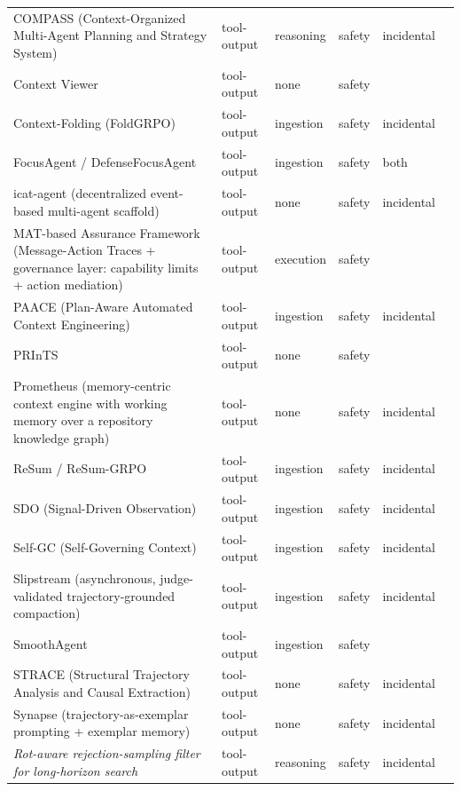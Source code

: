 \begin{longtable}{@{}p{}lllll@{}}
COMPASS (Context-Organized Multi-Agent Planning and Strategy System) & tool-output & reasoning & safety & incidental & \cite{wan-2025-compass} \\
Context Viewer & tool-output & none & safety &  & \cite{sriraman-2026-context} \\
Context-Folding (FoldGRPO) & tool-output & ingestion & safety & incidental & \cite{sun-2025-scaling} \\
FocusAgent / DefenseFocusAgent & tool-output & ingestion & safety & both & \cite{kerboua-2025-focusagent} \\
icat-agent (decentralized event-based multi-agent scaffold) & tool-output & none & safety & incidental & \cite{chen-2026-unlocking} \\
MAT-based Assurance Framework (Message-Action Traces + governance layer: capability limits + action mediation) & tool-output & execution & safety &  & \cite{paduraru-2026-tracebased} \\
PAACE (Plan-Aware Automated Context Engineering) & tool-output & ingestion & safety & incidental & \cite{yuksel-2025-paace} \\
PRInTS & tool-output & none & safety &  & \cite{lee-2025-prints} \\
Prometheus (memory-centric context engine with working memory over a repository knowledge graph) & tool-output & none & safety & incidental & \cite{pan-2025-prometheus} \\
ReSum / ReSum-GRPO & tool-output & ingestion & safety & incidental & \cite{wu-2025-resum} \\
SDO (Signal-Driven Observation) & tool-output & ingestion & safety & incidental & \cite{gaur-2026-signaldriven} \\
Self-GC (Self-Governing Context) & tool-output & ingestion & safety & incidental & \cite{hao-2026-selfgc} \\
Slipstream (asynchronous, judge-validated trajectory-grounded compaction) & tool-output & ingestion & safety & incidental & \cite{chen-2026-slipstream} \\
SmoothAgent & tool-output & ingestion & safety &  & \cite{pan-2026-smoothagent} \\
STRACE (Structural Trajectory Analysis and Causal Extraction) & tool-output & none & safety & incidental & \cite{chang-2026-noisy} \\
Synapse (trajectory-as-exemplar prompting + exemplar memory) & tool-output & none & safety & incidental & \cite{zheng-2023-synapse} \\
\emph{Rot-aware rejection-sampling filter for long-horizon search} & tool-output & reasoning & safety & incidental & \cite{xia-2026-diagnosing} \\

\end{longtable}
